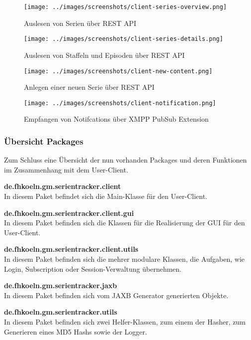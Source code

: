  \begin{figure}[H]
   \centering
\texttt{[image: ../images/screenshots/client-series-overview.png]}
\caption{Auslesen von Serien über REST API}
\label{overview}
\end{figure}

\begin{figure}[H]
  \centering
\texttt{[image: ../images/screenshots/client-series-details.png]}
\caption{Auslesen von Staffeln und Episoden über REST API}
\label{details}
\end{figure}

\begin{figure}[H]
\texttt{[image: ../images/screenshots/client-new-content.png]}
\caption{Anlegen einer neuen Serie über REST API}
\label{newcontent}
\end{figure}

\begin{figure}[H]
\texttt{[image: ../images/screenshots/client-notification.png]}
\caption{Empfangen von Notifcations über XMPP PubSub Extension}
\label{notification}
\end{figure}

\newpage

\subsubsection{Übersicht Packages}

Zum Schluss eine Übersicht der nun vorhanden Packages und deren Funktionen im Zusammenhang mit dem User-Client.


\textbf{de.fhkoeln.gm.serientracker.client}\\
In diesem Paket befindet sich die Main-Klasse für den User-Client.

\textbf{de.fhkoeln.gm.serientracker.client.gui}\\
In diesem Paket befinden sich die Klassen für die Realisierung der GUI für den User-Client.

\textbf{de.fhkoeln.gm.serientracker.client.utils}\\
In diesem Paket befinden sich die mehrer modulare Klassen, die Aufgaben, wie Login, Subscription oder Session-Verwaltung übernehmen.

\textbf{de.fhkoeln.gm.serientracker.jaxb}\\
In diesem Paket befinden sich vom JAXB Generator generierten Objekte.

\textbf{de.fhkoeln.gm.serientracker.utils}\\
In diesem Paket befinden sich zwei Helfer-Klassen, zum einem der Hasher, zum Generieren eines MD5 Hashs sowie der Logger.


